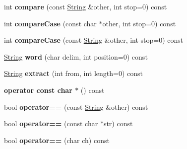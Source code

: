 \begin{DoxyCompactItemize}
\item 
int {\bfseries compare} (const \hyperlink{class_i_dream_sky_1_1_string}{String} \&other, int stop=0) const \hypertarget{class_i_dream_sky_1_1_string_a27e247ad23cf915516ac101daf1e3913}{}\label{class_i_dream_sky_1_1_string_a27e247ad23cf915516ac101daf1e3913}

\item 
int {\bfseries compare\+Case} (const char $\ast$other, int stop=0) const \hypertarget{class_i_dream_sky_1_1_string_a8103f52cb90824a0b8d78dce4af90b03}{}\label{class_i_dream_sky_1_1_string_a8103f52cb90824a0b8d78dce4af90b03}

\item 
int {\bfseries compare\+Case} (const \hyperlink{class_i_dream_sky_1_1_string}{String} \&other, int stop=0) const \hypertarget{class_i_dream_sky_1_1_string_ae18c6713484406646b276db8210af175}{}\label{class_i_dream_sky_1_1_string_ae18c6713484406646b276db8210af175}

\item 
\hyperlink{class_i_dream_sky_1_1_string}{String} {\bfseries word} (char delim, int position=0) const \hypertarget{class_i_dream_sky_1_1_string_ab67587968bb2f254426b4a6891d51f58}{}\label{class_i_dream_sky_1_1_string_ab67587968bb2f254426b4a6891d51f58}

\item 
\hyperlink{class_i_dream_sky_1_1_string}{String} {\bfseries extract} (int from, int length=0) const \hypertarget{class_i_dream_sky_1_1_string_a803b8fbb45479ff426534714f162dc65}{}\label{class_i_dream_sky_1_1_string_a803b8fbb45479ff426534714f162dc65}

\item 
{\bfseries operator const char $\ast$} () const \hypertarget{class_i_dream_sky_1_1_string_a052462069a3e139a69b88116bc8b9460}{}\label{class_i_dream_sky_1_1_string_a052462069a3e139a69b88116bc8b9460}

\item 
bool {\bfseries operator==} (const \hyperlink{class_i_dream_sky_1_1_string}{String} \&other) const \hypertarget{class_i_dream_sky_1_1_string_abc87daa85235a1fa0334d5aad76af032}{}\label{class_i_dream_sky_1_1_string_abc87daa85235a1fa0334d5aad76af032}

\item 
bool {\bfseries operator==} (const char $\ast$str) const \hypertarget{class_i_dream_sky_1_1_string_a34c0178e265b8eeff20a750c3a1d8190}{}\label{class_i_dream_sky_1_1_string_a34c0178e265b8eeff20a750c3a1d8190}

\item 
bool {\bfseries operator==} (char ch) const \hypertarget{class_i_dream_sky_1_1_string_a67f96b903219a03aa5d6715720cfbf02}{}\label{class_i_dream_sky_1_1_string_a67f96b903219a03aa5d6715720cfbf02}


\end{DoxyCompactItemize}
